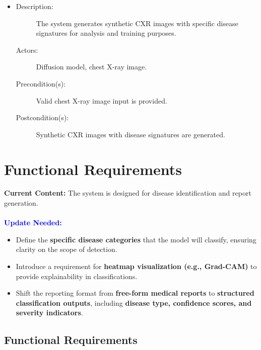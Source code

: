 \documentclass[12pt]{article}
\begin{document}
\begin{itemize}
    \item 
    \begin{description}
        \item[Description:] The system generates synthetic CXR images with specific disease signatures for analysis and training purposes.
        \item[Actors:] Diffusion model, chest X-ray image.
        \item[Precondition(s):] Valid chest X-ray image input is provided.
        \item[Postcondition(s):] Synthetic CXR images with disease signatures are generated.
    \end{description}
\end{itemize}

\section{Functional Requirements}

\textbf{Current Content:} The system is designed for disease identification and report generation. \\
\\
\textbf{\textcolor{blue}{Update Needed:}}
\begin{itemize}
    \item Define the \textbf{specific disease categories} that the model will classify, ensuring clarity on the scope of detection.
    \item Introduce a requirement for \textbf{heatmap visualization (e.g., Grad-CAM)} to provide explainability in classifications.
    \item Shift the reporting format from \textbf{free-form medical reports} to \textbf{structured classification outputs}, including \textbf{disease type, confidence scores, and severity indicators}.
\end{itemize}

\subsection{Functional Requirements}
\end{document}
